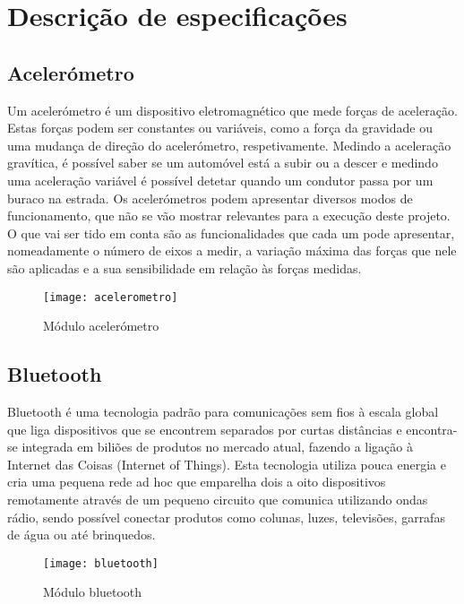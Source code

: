 \section{Descrição de especificações}
\label{sec:descrição_de_especificações}

\subsection{Acelerómetro}
\label{subsec:acelerometro}
		Um acelerómetro é um dispositivo eletromagnético que mede forças de aceleração. Estas forças podem ser constantes ou variáveis, como a força da gravidade ou uma mudança de direção do acelerómetro, respetivamente. Medindo a aceleração gravítica, é possível saber se um automóvel está a subir ou a descer e medindo uma aceleração variável é possível detetar quando um condutor passa por um buraco na estrada. Os acelerómetros podem apresentar diversos modos de funcionamento, que não se vão mostrar relevantes para a execução deste projeto. O que vai ser tido em conta são as funcionalidades que cada um pode apresentar, nomeadamente o número de eixos a medir, a variação máxima das forças que nele são aplicadas e a sua sensibilidade em relação às forças medidas.
\begin{figure}[htbp]
	\centering
	\texttt{[image: acelerometro]}
	\caption{Módulo acelerómetro}
	\label{fig:modulo_acelerometro}
\end{figure}	

\subsection{Bluetooth}
\label{subsec:bluetooth}
		Bluetooth é uma tecnologia padrão para comunicações sem fios à escala global que liga dispositivos que se encontrem separados por curtas distâncias e encontra-se integrada em biliões de produtos no mercado atual, fazendo a ligação à Internet das Coisas (Internet of Things). Esta tecnologia utiliza pouca energia e cria uma pequena rede ad hoc que emparelha dois a oito dispositivos remotamente através de um pequeno circuito que comunica utilizando ondas rádio, sendo possível conectar produtos como colunas, luzes, televisões, garrafas de água ou até brinquedos.		
\begin{figure}[htbp]
	\centering
	\texttt{[image: bluetooth]}
	\caption{Módulo bluetooth}
	\label{fig:modulo_bluetooth}
\end{figure}

